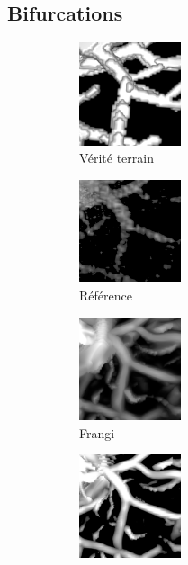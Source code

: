 \subsection{Bifurcations}


\begin{figure}[H]
  \centering
      \begin{subfigure}[t]{0.30\textwidth}
        \includegraphics[clip = true, trim  = 0 50 0 80, width=30mm]{Images/Ircad_k_GT.png}
        \caption{Vérité terrain}
      \end{subfigure}
      \begin{subfigure}[t]{0.30\textwidth}
        \includegraphics[clip = true, trim  = 0 50 0 80, width=30mm]{Images/Ircad_k_Baseline.png}
        \caption{Référence}
      \end{subfigure}
      \begin{subfigure}[t]{0.30\textwidth}
        \includegraphics[clip = true, trim  = 0 50 0 80, width=30mm]{Images/Ircad_k_Frangi.png}
        \caption{Frangi}
      \end{subfigure}
      \begin{subfigure}[t]{0.30\textwidth}
        \includegraphics[clip = true, trim  = 0 50 0 80, width=30mm]{Images/Ircad_k_Jerman.png}

\end{subfigure}
\end{figure}
